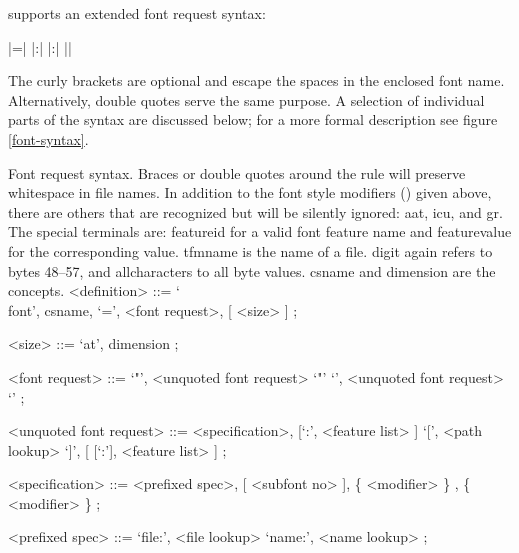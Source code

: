 \endsection


 supports an extended font request syntax:

\beginnarrower
      |\font\foo={|%
      |:|%
      |:|%
      |}|%
\endnarrower

\noindent
The curly brackets are optional and escape the spaces in the enclosed
font name.
%
Alternatively, double quotes serve the same purpose.
%
A selection of individual parts of the syntax are discussed below;
for a more formal description see figure \ref{font-syntax}.

\beginsyntaxfloat
  {Font request syntax.
   Braces or double quotes around the
    rule will
   preserve whitespace in file names.
   In addition to the font style modifiers
   () given above, there
   are others that are recognized but will be silently
   ignored: {\ttfamily aat},
            {\ttfamily icu}, and
            {\ttfamily gr}.
   The special terminals are:
   {\sc feature\textunderscore id} for a valid font
      feature name and
   {\sc feature\textunderscore value} for the corresponding
      value.
   {\sc tfmname} is the name of a  file.
   {\sc digit}  again refers to bytes 48--57, and
   {\sc all\textunderscore characters} to all byte values.
   {\sc csname} and {\sc dimension} are the \TEX concepts.}
%
      <definition>      ::= `\\font', {\sc csname}, `=', <font request>, [ <size> ] ;

      <size>            ::= `at', {\sc dimension} ;

      <font request>    ::= `"', <unquoted font request> `"'
      \alt                  `{', <unquoted font request> `}'
       ;

      <unquoted font request> ::= <specification>, [`:', <feature list> ]
      \alt                        `[', <path lookup> `]', [ [`:'], <feature list> ] ;

      <specification>    ::= <prefixed spec>, [ <subfont no> ], \{ <modifier> \}
      , \{ <modifier> \} ;

      <prefixed spec>    ::= `file:', <file lookup>
      \alt                   `name:', <name lookup> ;

